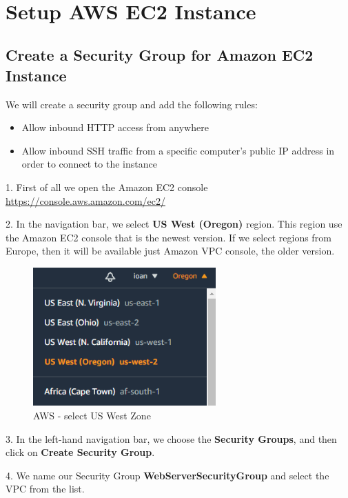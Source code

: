 \documentclass[12pt,a4paper,twoside]{article}
\begin{document}
~\newpage



\section{Setup AWS EC2 Instance}


\subsection{Create a Security Group for Amazon EC2 Instance}


We will create a security group and add the following rules:
\begin{itemize}
	\item Allow inbound HTTP access from anywhere
	\item Allow inbound SSH traffic from a specific computer's public IP address in order to connect to the instance
\end{itemize}


1. First of all we open the Amazon EC2 console \url{ https://console.aws.amazon.com/ec2/} 


2. In the navigation bar, we select \textbf{US West (Oregon)} region. This region use the Amazon EC2 console that is the newest version. If we select regions from Europe, then it will be available just Amazon VPC console, the older version.


\begin{figure}[H]
    \centering
        \includegraphics[width=7cm]{images-aws/1-aws-zone.png}
        \caption{AWS - select US West Zone}
\end{figure}


3. In the left-hand navigation bar, we choose the \textbf{Security Groups}, and then click on \textbf{Create Security Group}.


4. We name our Security Group \textbf{WebServerSecurityGroup} and select the VPC from the list.
\end{document}
